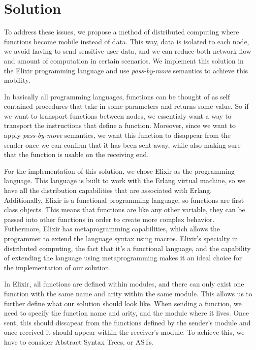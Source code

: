 
\chapter{Solution}
\label{cha:Solution}

To address these issues, we propose a method of distributed computing where functions become mobile instead of data. This way, data is isolated to each node, we avoid having to send sensitive user data, and we can reduce both network flow and amount of computation in certain scenarios. We implement this solution in the Elixir programming language and use \textit{pass-by-move} semantics to achieve this mobility.

In basically all programming languages, functions can be thought of as self contained procedures that take in some parameters and returns some value. So if we want to transport functions between nodes, we essentialy want a way to transport the instructions that define a function. Moreover, since we want to apply \textit{pass-by-move} semantics, we want this function to disappear from the sender once we can confirm that it has been sent away, while also making sure that the function is usable on the receiving end. 

For the implementation of this solution, we chose Elixir as the programming language. This language is built to work with the Erlang virtual machine, so we have all the distribution capabilities that are associated with Erlang. Additionally, Elixir is a functional programming language, so functions are first class objects. This means that functions are like any other variable, they can be passed into other functions in order to create more complex behavior. Futhermore, Elixir has metaprogramming capabilities, which allows the programmer to extend the language syntax using macros. Elixir's specialty in distributed computing, the fact that it's a functional language, and the capability of extending the language using metaprogramming makes it an ideal choice for the implementation of our solution.

In Elixir, all functions are defined within modules, and there can only exist one function with the same name and arity within the same module. This allows us to further define what our solution should look like. When sending a function, we need to specify the function name and arity, and the module where it lives. Once sent, this should dissapear from the functions defined by the sender's module and once received it should appear within the receiver's module. To achieve this, we have to consider Abstract Syntax Trees, or ASTs. 

